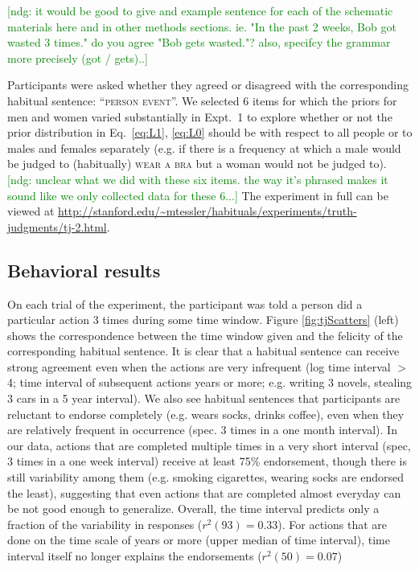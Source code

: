 \documentclass[10pt,letterpaper]{article}
\newcommand{\ndg}[1]{\textcolor{Green}{[ndg: #1]}}
\begin{document}
\ndg{it would be good to give and example sentence for each of the schematic materials here and in other methods sections. ie. "In the past 2 weeks, Bob got wasted 3 times." do you agree "Bob gets wasted."?
also, specifcy the grammar more precisely (got / gets)..}

Participants were asked whether they agreed or disagreed with the corresponding habitual sentence: ``\textsc{person event}''.
We selected 6 items for which the priors for men and women varied substantially in Expt.~1 to explore whether or not the prior distribution in Eq.~\ref{eq:L1}, \ref{eq:L0} should be with respect to all people or to males and females separately (e.g. if there is a frequency at which a male would be judged to (habitually) \textsc{wear a bra} but a woman would not be judged to). 
\ndg{unclear what we did with these six items. the way it's phrased makes it sound like we only collected data for these 6...}
The experiment in full can be viewed at \url{http://stanford.edu/~mtessler/habituals/experiments/truth-judgments/tj-2.html}.



\subsection{Behavioral results}

On each trial of the experiment, the participant was told a person did a particular action 3 times during some time window. 
Figure \ref{fig:tjScatters} (left) shows the correspondence between the time window given and the felicity of the corresponding habitual sentence. 
It is clear that a habitual sentence can receive strong agreement even when the actions are very infrequent (log time interval $>$ 4; time interval of subsequent actions years or more; e.g. writing 3 novels, stealing 3 cars in a 5 year interval).
We also see habitual sentences that participants are reluctant to endorse completely (e.g. wears socks, drinks coffee), even when they are relatively frequent in occurrence (spec. 3 times in a one month interval).
In our data, actions that are completed multiple times in a very short interval (spec, 3 times in a one week interval) receive at least 75\% endorsement, though there is still variability among them (e.g. smoking cigarettes, wearing socks are endorsed the least), suggesting that even actions that are completed almost everyday can be not good enough to generalize.
Overall, the time interval predicts only a fraction of the variability in responses ($r^2(93) = 0.33$).
For actions that are done on the time scale of years or more (upper median of time interval), time interval itself no longer explains the endorsements  ($r^2(50) = 0.07$)
\end{document}
